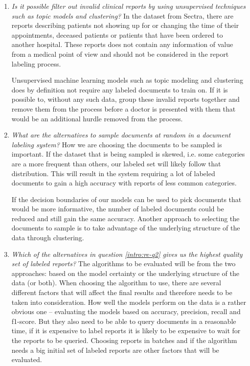 \begin{enumerate}

\item \textit{Is it possible filter out invalid clinical reports by using unsupervised techniques such as topic models and clustering?}
      \newline
      In the dataset from Sectra, there are reports describing patients not showing up for or changing the time of their appointments, deceased patients or patients that have been ordered to another hospital.
      These reports does not contain any information of value from a medical point of view and should not be considered in the report labeling process.

      Unsupervised machine learning models such as topic modeling and clustering does by definition not require any labeled documents to train on.
      If it is possible to, without any such data, group these invalid reports together and remove them from the process before a doctor is presented with them that would be an additional hurdle removed from the process.

\item \label{intro:re-q2} 
      \textit{What are the alternatives to sample documents at random in a document labeling system?}
      \newline
      How we are choosing the documents to be sampled is important.
      If the dataset that is being sampled is skewed, i.e. some categories are a more frequent than others, our labeled set will likely follow that distribution.
      This will result in the system requiring a lot of labeled documents to gain a high accuracy with reports of less common categories.

      If the decision boundaries of our models can be used to pick documents that would be more informative, the number of labeled documents could be reduced and still gain the same accuracy.
      Another approach to selecting the documents to sample is to take advantage of the underlying structure of the data through clustering.

\item \textit{Which of the alternatives in question \ref{intro:re-q2} gives us the highest quality set of labeled reports?}
      \newline
      The algorithms to be evaluated will be from the two approaches: based on the model certainty or the underlying structure of the data (or both).
      When choosing the algorithm to use, there are several different factors that will affect the final results and therefore needs to be taken into consideration.
      How well the models perform on the data is a rather obvious one -- evaluating the models based on accuracy, precision, recall and f1-score.
      But they also need to be able to query documents in a reasonable time, if it is expensive to label reports it is likely to be expensive to wait for the reports to be queried.
      Choosing reports in batches and if the algorithm needs a big initial set of labeled reports are other factors that will be evaluated.


\end{enumerate}
